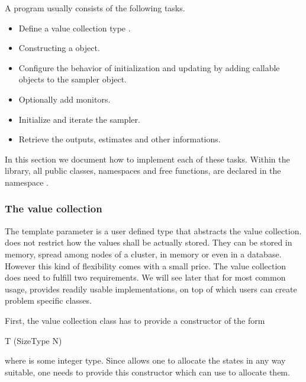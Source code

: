 A \vsmc program usually consists of the following tasks.
\begin{itemize}
  \item Define a value collection type .
  \item Constructing a  object.
  \item Configure the behavior of initialization and updating by adding
    callable objects to the sampler object.
  \item Optionally add monitors.
  \item Initialize and iterate the sampler.
  \item Retrieve the outputs, estimates and other informations.
\end{itemize}
In this section we document how to implement each of these tasks. Within the
\vsmc library, all public classes, namespaces and free functions, are declared
in the namespace .

\subsubsection{The value collection}
\label{ssub:The value collection}

The template parameter  is a user defined type that abstracts the
value collection. \vsmc does not restrict how the values shall be actually
stored. They can be stored in memory, spread among nodes of a cluster, in \gpu
memory or even in a database. However this kind of flexibility comes with a
small price. The value collection does need to fulfill two requirements. We
will see later that for most common usage, \vsmc provides readily usable
implementations, on top of which users can create problem specific classes.

First, the value collection class  has to provide a constructor of the
form
\begin{cppcode}
T (SizeType N)
\end{cppcode}
where  is some integer type. Since \vsmc allows one to allocate
the states in any way suitable, one needs to provide this constructor which
 can use to allocate them.

